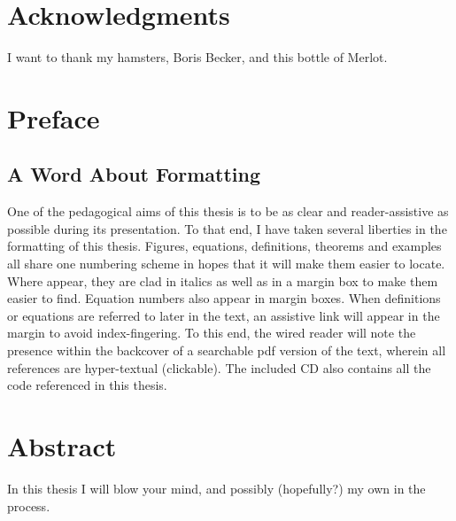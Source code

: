 \chapter*{Acknowledgments}
I want to thank my hamsters, Boris Becker, and this bottle of Merlot.

\chapter*{Preface}
\section*{A Word About Formatting}
One of the pedagogical aims of this thesis is to be as clear and reader-assistive as possible during its presentation.  To that end, I have taken several liberties in the formatting of this thesis.  Figures, equations, definitions, theorems and examples all share one numbering scheme in hopes that it will make them easier to locate. Where  appear, they are clad in italics as well as in a margin box to make them easier to find.  Equation numbers also appear in margin boxes.  When  definitions or equations are referred to later in the text, an assistive link will appear in the margin to avoid index-fingering.  To this end, the wired reader will note the presence within the backcover of a searchable pdf version of the text, wherein all references are hyper-textual (clickable).  The included CD also contains all the code referenced in this thesis.  

\chapter*{Abstract}
In this thesis I will blow your mind, and possibly (hopefully?) my own in the process.

